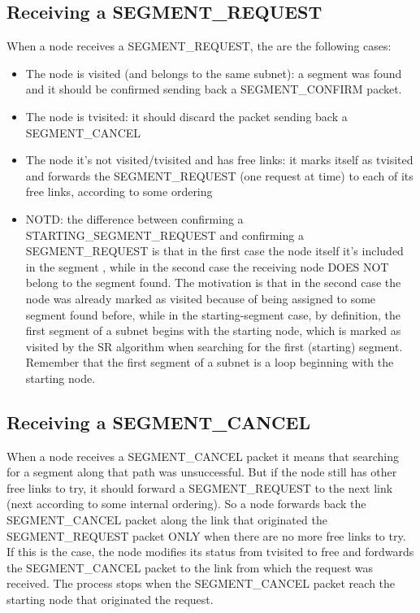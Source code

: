 \documentclass[final,journal,letterpaper]{IEEEtran}
\begin{document}
\subsection{Receiving a SEGMENT\_REQUEST}
When a node receives a SEGMENT\_REQUEST, the are the following cases:

\begin{itemize}
\item The node is visited (and belongs to the same subnet): a segment was
found and it should be confirmed sending back a SEGMENT\_CONFIRM
packet.  

\item The node is tvisited: it should discard the packet sending
back a SEGMENT\_CANCEL 

\item The node it's not visited/tvisited and has free
links: it marks itself as tvisited and forwards the SEGMENT\_REQUEST
(one request at time) to each of its free links, according to some
ordering

\item NOTD: the difference between confirming a STARTING\_SEGMENT\_REQUEST
and confirming a SEGMENT\_REQUEST is that in the first case the node
itself it's included in the segment , while in the second case the
receiving node DOES NOT belong to the segment found. The motivation is
that in the second case the node was already marked as visited because
of being assigned to some segment found before, while in the
starting-segment case, by definition, the first segment of a subnet
begins with the starting node, which is marked as visited by the SR
algorithm when searching for the first (starting) segment. Remember
that the first segment of a subnet is a loop beginning with the
starting node. 
\end{itemize}

\subsection{Receiving a SEGMENT\_CANCEL}
When a node receives a SEGMENT\_CANCEL packet it means that searching
for a segment along that path was unsuccessful. But if the node still
has other free links to try, it should forward a SEGMENT\_REQUEST to
the next link (next according to some internal ordering). So a node
forwards back the SEGMENT\_CANCEL packet along the link that originated
the SEGMENT\_REQUEST packet ONLY when there are no more free links to
try. If this is the case, the node modifies its status from tvisited
to free and fordwards the SEGMENT\_CANCEL packet to the link from which
the request was received. The process stops when the SEGMENT\_CANCEL
packet reach the starting node that originated the request.
\end{document}
